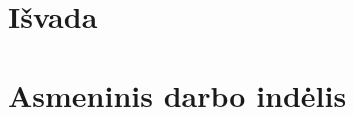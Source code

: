 \documentclass[oneside]{VUMIFPSkursinis}
\begin{document}
\section{Išvada}

\section{Asmeninis darbo indėlis}
\end{document}
